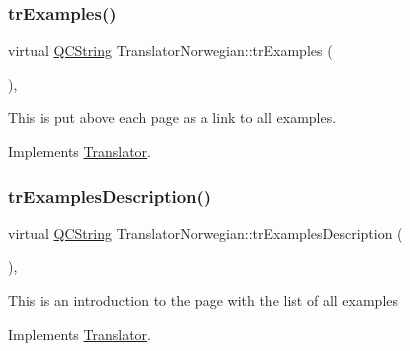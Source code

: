 \mbox{\label{class_translator_norwegian_a809b1833c57839084661bf3e075a43b3}} 
\subsubsection{\texorpdfstring{trExamples()}{trExamples()}}
{\footnotesize\ttfamily virtual \mbox{\hyperlink{class_q_c_string}{Q\+C\+String}} Translator\+Norwegian\+::tr\+Examples (\begin{DoxyParamCaption}{ }\end{DoxyParamCaption})\hspace{0.3cm}{\ttfamily [inline]}, {\ttfamily [virtual]}}

This is put above each page as a link to all examples. 

Implements \mbox{\hyperlink{class_translator}{Translator}}.

\mbox{\label{class_translator_norwegian_a3b1e3c1b1bb2c424f52898d3a7317e4f}} 
\subsubsection{\texorpdfstring{trExamplesDescription()}{trExamplesDescription()}}
{\footnotesize\ttfamily virtual \mbox{\hyperlink{class_q_c_string}{Q\+C\+String}} Translator\+Norwegian\+::tr\+Examples\+Description (\begin{DoxyParamCaption}{ }\end{DoxyParamCaption})\hspace{0.3cm}{\ttfamily [inline]}, {\ttfamily [virtual]}}

This is an introduction to the page with the list of all examples 

Implements \mbox{\hyperlink{class_translator}{Translator}}.

\mbox{\label{class_translator_norwegian_af7e07ca08e6f39ba175943fca916b7cf}} 
